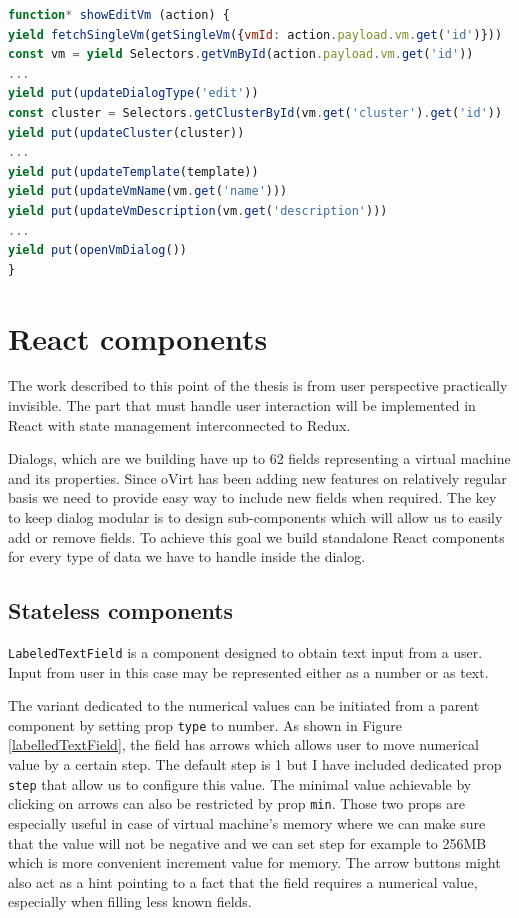 \bigskip
\begin{lstlisting}[language=javascript,xleftmargin=3.5ex,caption={Saga responsible for initiating and showing the Edit VM dialog }]
function* showEditVm (action) {
yield fetchSingleVm(getSingleVm({vmId: action.payload.vm.get('id')}))
const vm = yield Selectors.getVmById(action.payload.vm.get('id'))
...
yield put(updateDialogType('edit'))
const cluster = Selectors.getClusterById(vm.get('cluster').get('id'))
yield put(updateCluster(cluster))
...
yield put(updateTemplate(template))
yield put(updateVmName(vm.get('name')))
yield put(updateVmDescription(vm.get('description')))
...
yield put(openVmDialog())
}
\end{lstlisting}\label{editVmSaga}
\bigskip

\section{React components}
The work described to this point of the thesis is from user perspective practically invisible. The part that must handle user interaction will be implemented in React with state management interconnected to Redux. 

Dialogs, which are we building have up to 62 fields representing a virtual machine and its properties. Since oVirt has been adding new features on relatively regular basis we need to provide easy way to include new fields when required. The key to keep dialog modular is to design sub-components which will allow us to easily add or remove fields. To achieve this goal we build standalone React components for every type of data we have to handle inside the dialog.

\subsection{Stateless components}
\texttt{LabeledTextField} is a component designed to obtain text input from a user. Input from user in this case may be represented either as a number or as text.

The variant dedicated to the numerical values can be initiated from a parent component by setting prop \texttt{type} to number. As shown in Figure~ \ref{labelledTextField}, the field has arrows which allows user to move numerical value by a certain step. The default step is 1 but I have included dedicated prop \texttt{step} that allow us to configure this value. The minimal value achievable by clicking on arrows can also be restricted by prop \texttt{min}. Those two props are especially useful in case of virtual machine's memory where we can make sure that the value will not be negative and we can set step for example to 256MB which is more convenient increment value for memory. 
The arrow buttons might also act as a hint pointing to a fact that the field requires a numerical value, especially when filling less known fields.


